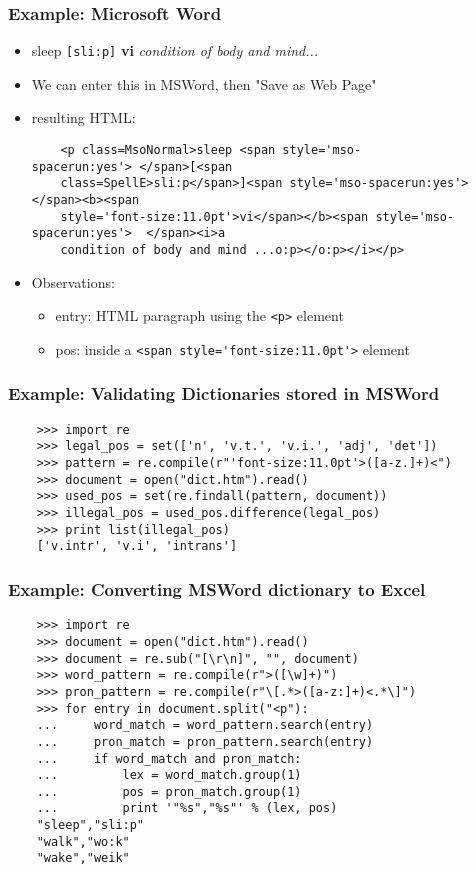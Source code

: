 \documentclass{beamer}
\begin{document}
\begin{frame}[fragile]
\frametitle{Example: Microsoft Word}
\begin{itemize}
\item sleep \verb|[sli:p]| \textbf{vi} \textit{condition of body and mind...}
\item We can enter this in MSWord, then "Save as Web Page"
\item resulting HTML:

\begin{verbatim}
    <p class=MsoNormal>sleep <span style='mso-spacerun:yes'> </span>[<span
    class=SpellE>sli:p</span>]<span style='mso-spacerun:yes'>  </span><b><span
    style='font-size:11.0pt'>vi</span></b><span style='mso-spacerun:yes'>  </span><i>a
    condition of body and mind ...o:p></o:p></i></p>
\end{verbatim}

\item Observations:
  \begin{itemize}
  \item entry: HTML paragraph using the \verb|<p>| element
  \item pos: inside a \verb|<span style='font-size:11.0pt'>| element
  \end{itemize}
\end{itemize}
\end{frame}

\begin{frame}[fragile]
\frametitle{Example: Validating Dictionaries stored in MSWord}

\begin{verbatim}
    >>> import re
    >>> legal_pos = set(['n', 'v.t.', 'v.i.', 'adj', 'det'])
    >>> pattern = re.compile(r"'font-size:11.0pt'>([a-z.]+)<")
    >>> document = open("dict.htm").read()
    >>> used_pos = set(re.findall(pattern, document))
    >>> illegal_pos = used_pos.difference(legal_pos)
    >>> print list(illegal_pos)
    ['v.intr', 'v.i', 'intrans']
\end{verbatim}
\end{frame}

\begin{frame}[fragile]
\frametitle{Example: Converting MSWord dictionary to Excel}

\begin{verbatim}
    >>> import re
    >>> document = open("dict.htm").read()
    >>> document = re.sub("[\r\n]", "", document)
    >>> word_pattern = re.compile(r">([\w]+)")
    >>> pron_pattern = re.compile(r"\[.*>([a-z:]+)<.*\]")
    >>> for entry in document.split("<p"):
    ...     word_match = word_pattern.search(entry)
    ...     pron_match = pron_pattern.search(entry)
    ...     if word_match and pron_match:
    ...         lex = word_match.group(1)
    ...         pos = pron_match.group(1)
    ...         print '"%s","%s"' % (lex, pos)
    "sleep","sli:p"
    "walk","wo:k"
    "wake","weik"
\end{verbatim}
\end{frame}
\end{document}
